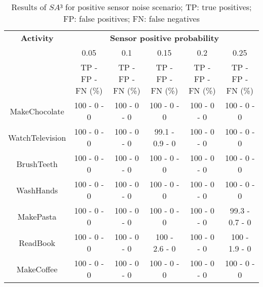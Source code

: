 \begin{table}[htbp]\scriptsize
    \begin{center}    
        \begin{tabular}{cccccc}
            \hline            
            \textbf{Activity} & \multicolumn{5}{c}{\textbf{Sensor positive probability}}\\
             & 0.05 & 0.1 & 0.15 & 0.2 & 0.25 \\
             & TP - FP - FN (\%) & TP - FP - FN (\%) & TP - FP - FN (\%) & TP - FP - FN (\%) & TP - FP - FN (\%)\\
            \hline
            MakeChocolate   & 100 - 0 - 0 & 100 - 0 - 0 & 100 - 0 - 0 & 100 - 0 - 0 & 100 - 0 - 0 \\
	    WatchTelevision & 100 - 0 - 0 & 100 - 0 - 0 & 99.1 - 0.9 - 0 & 100 - 0 - 0 & 100 - 0 - 0 \\
	    BrushTeeth      & 100 - 0 - 0 & 100 - 0 - 0 & 100 - 0 - 0 & 100 - 0 - 0 & 100 - 0 - 0 \\
	    WashHands       & 100 - 0 - 0 & 100 - 0 - 0 & 100 - 0 - 0 & 100 - 0 - 0 & 100 - 0 - 0 \\
	    MakePasta       & 100 - 0 - 0 & 100 - 0 - 0 & 100 - 0 - 0 & 100 - 0 - 0 & 99.3 - 0.7 - 0 \\
	    ReadBook        & 100 - 0 - 0 & 100 - 0 - 0 & 100 - 2.6 - 0 & 100 - 0 - 0 & 100 - 1.9 - 0 \\
	    MakeCoffee      & 100 - 0 - 0 & 100 - 0 - 0 & 100 - 0 - 0 & 100 - 0 - 0 & 100 - 0 - 0 \\
            \hline
        \end{tabular}          
        \caption{Results of $SA³$ for positive sensor noise scenario; TP: true positives; FP: false positives; FN: false negatives}
        \label{tab-sa3-positive}
    \end{center}
\end{table}


